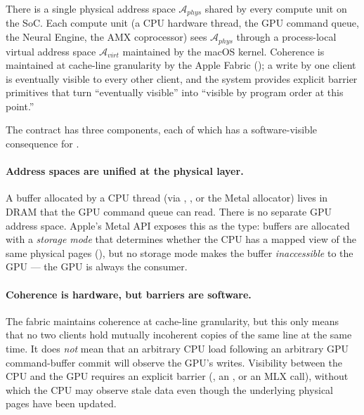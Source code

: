\begin{contract}
\label{contract:unified_memory}
There is a single physical address space \(\mathcal{A}_{phys}\)
shared by every compute unit on the SoC. Each compute unit (a CPU
hardware thread, the GPU command queue, the Neural Engine, the AMX
coprocessor) sees \(\mathcal{A}_{phys}\) through a process-local
virtual address space \(\mathcal{A}_{virt}\) maintained by the macOS
kernel. Coherence is maintained at cache-line granularity by the
Apple Fabric (); a write by one
client is eventually visible to every other client, and the system
provides explicit barrier primitives that turn ``eventually visible''
into ``visible by program order at this point.''
\end{contract}

The contract has three components, each of which has a
software-visible consequence for \Lucid.

\paragraph{Address spaces are unified at the physical layer.} A
buffer allocated by a CPU thread (via ,
, or the Metal allocator) lives in DRAM that the GPU
command queue can read. There is no separate GPU address space.
Apple's Metal API exposes this as the  type:
buffers are allocated with a \emph{storage mode} that determines
whether the CPU has a mapped view of the same physical pages
(), but no storage mode
makes the buffer \emph{inaccessible} to the GPU --- the GPU is
always the consumer.

\paragraph{Coherence is hardware, but barriers are software.} The
fabric maintains coherence at cache-line granularity, but this only
means that no two clients hold mutually incoherent copies of the same
line at the same time. It does \emph{not} mean that an arbitrary CPU
load following an arbitrary GPU command-buffer commit will observe
the GPU's writes. Visibility between the CPU and the GPU requires an
explicit barrier (, an
, or an MLX  call), without which
the CPU may observe stale data even though the underlying physical
pages have been updated.


